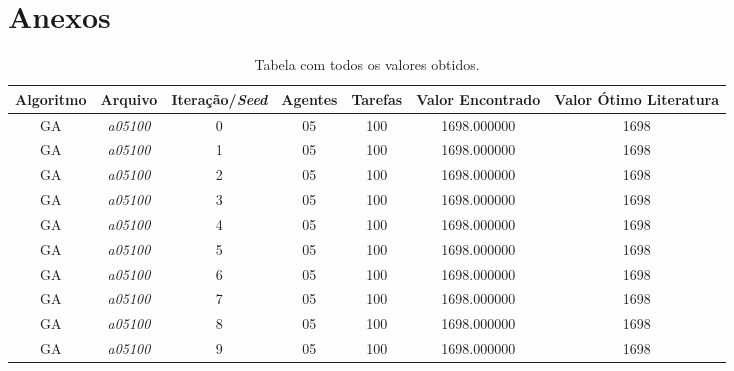 
	\newpage
	\section{Anexos} \label{sec:anexo}
	
	{ \scriptsize
		\begin{longtable}{cc|c|cc|cc}
			\caption{Tabela com todos os valores obtidos.} \label{tab:resulAll} \\
			\hline
			\textbf{Algoritmo} & \textbf{Arquivo}   & \textbf{Iteração/\textit{Seed}} & \textbf{Agentes} & \textbf{Tarefas} & \textbf{Valor Encontrado} & \textbf{Valor Ótimo Literatura} \\ \hline \hline
			GA                 & \textit{a05100}    & 0                               & 05               & 100              & 1698.000000                          & 1698 \\  
			GA                 & \textit{a05100}    & 1                               & 05               & 100              & 1698.000000                          & 1698 \\  
			GA                 & \textit{a05100}    & 2                               & 05               & 100              & 1698.000000                          & 1698 \\  
			GA                 & \textit{a05100}    & 3                               & 05               & 100              & 1698.000000                          & 1698 \\  
			GA                 & \textit{a05100}    & 4                               & 05               & 100              & 1698.000000                          & 1698 \\  
			GA                 & \textit{a05100}    & 5                               & 05               & 100              & 1698.000000                          & 1698 \\  
			GA                 & \textit{a05100}    & 6                               & 05               & 100              & 1698.000000                          & 1698 \\  
			GA                 & \textit{a05100}    & 7                               & 05               & 100              & 1698.000000                          & 1698 \\  
			GA                 & \textit{a05100}    & 8                               & 05               & 100              & 1698.000000                          & 1698 \\  
			GA                 & \textit{a05100}    & 9                               & 05               & 100              & 1698.000000                          & 1698 \\  \hline

\end{longtable}}

